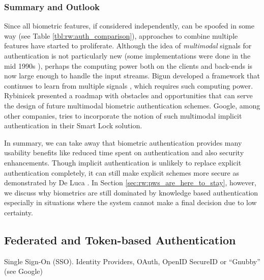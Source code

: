 	\subsubsection{Summary and Outlook}
	Since all biometric features, if considered independently, can be spoofed in some way (see Table \ref{tbl:rw:auth_comparison}), approaches to combine multiple features have started to proliferate. Although the idea of \textit{multimodal} signals for authentication is not particularly new (some implementations were done in the mid 1990s \cite{Brunelli1995PersonIdentificationMultipleCues}), perhaps the computing power both on the clients and back-ends is now large enough to handle the input streams. Bigun \etal developed a framework that continues to learn from multiple signals \cite{Bigun2005CombiningBiometricEvidence}, which requires such computing power.	Rybinicek \etal presented a roadmap with obstacles and opportunities \cite{Rybnicek2014RoadmapContinuousAuth} that can serve the design of future multimodal biometric authentication schemes. Google, among other companies, tries to incorporate the notion of such multimodal implicit authentication in their Smart Lock solution. 
	
	In summary, we can take away that biometric authentication provides many usability benefits like reduced time spent on authentication and also security enhancements. Though implicit authentication is unlikely to replace explicit authentication completely, it can still make explicit schemes more secure as demonstrated by De Luca \etal \cite{DeLuca2012TouchMeOnce}. In Section \ref{sec:rw:pws_are_here_to_stay}, however, we discuss why biometrics are still dominated by knowledge based authentication especially in situations where the system cannot make a final decision due to low certainty. 
	
	
		
	\subsection{Federated and Token-based Authentication}\label{sec:rw:shared_auth_tokens}
Single Sign-On (SSO). 
Identity Providers, OAuth, OpenID
SecureID or ``Gnubby'' (see Google)


